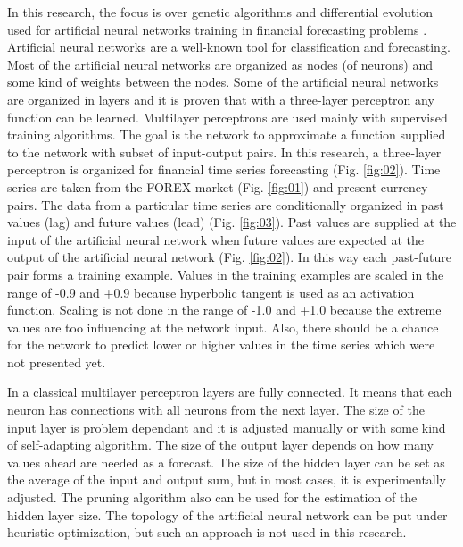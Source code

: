 \documentclass[graybox]{svmult}
\begin{document}
In this research, the focus is over genetic algorithms and differential evolution used for artificial neural networks training in financial forecasting problems \cite{money-bee-01,genetic-algorithms-01}. Artificial neural networks are a well-known tool for classification and forecasting. Most of the artificial neural networks are organized as nodes (of neurons) and some kind of weights between the nodes. Some of the artificial neural networks are organized in layers and it is proven that with a three-layer perceptron any function can be learned. Multilayer perceptrons are used mainly with supervised training algorithms. The goal is the network to approximate a function supplied to the network with subset of input-output pairs. In this research, a three-layer perceptron is organized for financial time series \cite{time-series-01,time-series-02,time-series-03} forecasting (Fig. \ref{fig:02}). Time series are taken from the FOREX market (Fig. \ref{fig:01}) and present currency pairs. The data from a particular time series are conditionally organized in past values (lag) and future values (lead) (Fig. \ref{fig:03}). Past values are supplied at the input of the artificial neural network when future values are expected at the output of the artificial neural network (Fig. \ref{fig:02}). In this way each past-future pair forms a training example. Values in the training examples are scaled in the range of -0.9 and +0.9 because hyperbolic tangent is used as an activation function. Scaling is not done in the range of -1.0 and +1.0 because the extreme values are too influencing at the network input. Also, there should be a chance for the network to predict lower or higher values in the time series which were not presented yet. 

In a classical multilayer perceptron layers are fully connected. It means that each neuron has connections with all neurons from the next layer. The size of the input layer is problem dependant and it is adjusted manually or with some kind of self-adapting algorithm. The size of the output layer depends on how many values ahead are needed as a forecast. The size of the hidden layer can be set as the average of the input and output sum, but in most cases, it is experimentally adjusted. The pruning algorithm also can be used for the estimation of the hidden layer size. The topology of the artificial neural network can be put under heuristic optimization, but such an approach is not used in this research. 
\end{document}
